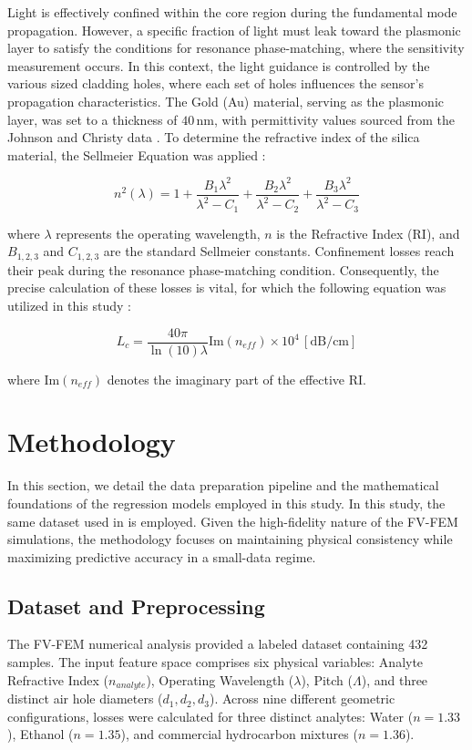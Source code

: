 \documentclass[conference]{IEEEtran}
\begin{document}
Light is effectively confined within the core region during the fundamental mode propagation. However, a specific fraction of light must leak toward the plasmonic layer to satisfy the conditions for resonance phase-matching, where the sensitivity measurement occurs. In this context, the light guidance is controlled by the various sized cladding holes, where each set of holes influences the sensor’s propagation characteristics. The Gold (Au) material, serving as the plasmonic layer, was set to a thickness of $40\,\text{nm}$, with permittivity values sourced from the Johnson and Christy data \cite{b6}. To determine the refractive index of the silica material, the Sellmeier Equation was applied \cite{b5}:

\begin{equation}
	n^2(\lambda) = 1 + \frac{B_1\lambda^2}{\lambda^2 - C_1} + \frac{B_2\lambda^2}{\lambda^2 - C_2} + \frac{B_3\lambda^2}{\lambda^2 - C_3}
	\label{eq:sellmeier}
\end{equation}

where $\lambda$ represents the operating wavelength, $n$ is the Refractive Index (RI), and $B_{1,2,3}$ and $C_{1,2,3}$ are the standard Sellmeier constants. Confinement losses reach their peak during the resonance phase-matching condition. Consequently, the precise calculation of these losses is vital, for which the following equation was utilized in this study \cite{b1}:

\begin{equation}
	L_c = \frac{40\pi}{\ln(10)\lambda} \text{Im}(n_{eff}) \times 10^4 \, [\text{dB/cm}]
	\label{eq:confinement_loss}
\end{equation}

where $\text{Im}(n_{eff})$ denotes the imaginary part of the effective RI. 

\section{Methodology}
In this section, we detail the data preparation pipeline and the mathematical foundations of the regression models employed in this study. In this study, the same dataset used in \cite{b1} is employed. Given the high-fidelity nature of the FV-FEM simulations, the methodology focuses on maintaining physical consistency while maximizing predictive accuracy in a small-data regime.

\subsection{Dataset and Preprocessing}
The FV-FEM numerical analysis provided a labeled dataset containing 432 samples. The input feature space comprises six physical variables: Analyte Refractive Index ($n_{analyte}$), Operating Wavelength ($\lambda$), Pitch ($\Lambda$), and three distinct air hole diameters ($d_1, d_2, d_3$). Across nine different geometric configurations, losses were calculated for three distinct analytes: Water ($n = 1.33$), Ethanol ($n = 1.35$), and commercial hydrocarbon mixtures ($n = 1.36$).
\end{document}
